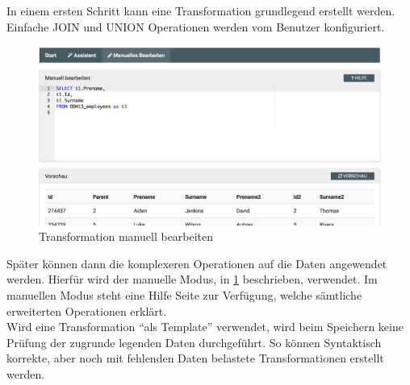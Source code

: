 In einem ersten Schritt kann eine Transformation grundlegend erstellt werden. Einfache JOIN und UNION Operationen werden vom Benutzer konfiguriert.
\begin{figure}[H]
\centering
\includegraphics[width=\linewidth]{fig/wizard-manual.png}
\caption{Transformation manuell bearbeiten}
\label{fig:pd:wizard-manual}
\end{figure}

Später können dann die komplexeren Operationen auf die Daten angewendet werden. Hierfür wird der manuelle Modus, in \cref{fig:pd:wizard-manual} beschrieben, verwendet. Im manuellen Modus steht eine Hilfe Seite zur Verfügung, welche sämtliche erweiterten Operationen erklärt.\\
Wird eine Transformation ``als Template'' verwendet, wird beim Speichern keine Prüfung der zugrunde legenden Daten durchgeführt. So können Syntaktisch korrekte, aber noch mit fehlenden Daten belastete Transformationen erstellt werden.

